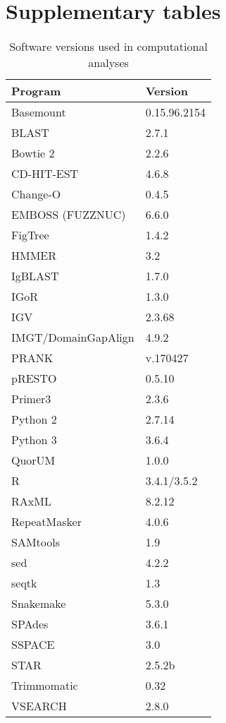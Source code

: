 \chapter{Supplementary tables}
\label{app:tables}

\begin{table}
\caption{Software versions used in computational analyses}
\label{tab:software-versions}
\centering
\begin{tabular}{ll}
  \toprule Program & Version \\ 
  \midrule Basemount & 0.15.96.2154 \\ 
  BLAST & 2.7.1 \\ 
  Bowtie 2 & 2.2.6 \\ 
  CD-HIT-EST & 4.6.8 \\ 
  Change-O & 0.4.5 \\ 
  EMBOSS (FUZZNUC) & 6.6.0 \\ 
  FigTree & 1.4.2 \\ 
  HMMER & 3.2 \\ 
  IgBLAST & 1.7.0 \\ 
  IGoR & 1.3.0 \\ 
  IGV & 2.3.68 \\ 
  IMGT/DomainGapAlign & 4.9.2 \\ 
  PRANK & v.170427 \\ 
  pRESTO & 0.5.10 \\ 
  Primer3 & 2.3.6 \\ 
  Python 2 & 2.7.14 \\ 
  Python 3 & 3.6.4 \\ 
  QuorUM & 1.0.0 \\ 
  R & 3.4.1/3.5.2 \\ 
  RAxML & 8.2.12 \\ 
  RepeatMasker & 4.0.6 \\ 
  SAMtools & 1.9 \\ 
  sed & 4.2.2 \\ 
  seqtk & 1.3 \\ 
  Snakemake & 5.3.0 \\ 
  SPAdes & 3.6.1 \\ 
  SSPACE & 3.0 \\ 
  STAR & 2.5.2b \\ 
  Trimmomatic & 0.32 \\ 
  VSEARCH & 2.8.0 \\ 
   \bottomrule 
\end{tabular}
\end{table}


